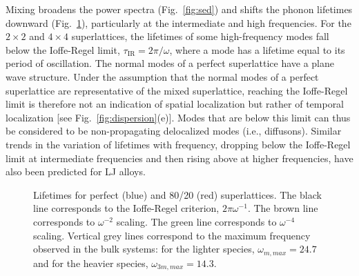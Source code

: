 \documentclass[aps,prb,preprint,preprintnumbers,amsmath,amssymb,floatfix,superscriptaddress]{revtex4}
\begin{document}
Mixing broadens the power spectra (Fig.~\ref{fig:sed}) and shifts the phonon lifetimes downward (Fig.~\ref{FIG:lifetime}), particularly at the intermediate and high frequencies. For the $2 \times 2$ and $ 4 \times 4$ superlattices,  the lifetimes of some high-frequency modes fall below the Ioffe-Regel limit, $\tau_\mathrm{IR} =2\pi/\omega$, where a mode has a lifetime equal to its period of oscillation. The normal modes of a perfect superlattice have a plane wave structure. Under the assumption that the normal modes of a perfect superlattice are representative of the mixed superlattice, reaching the Ioffe-Regel limit is therefore not an indication of spatial localization but rather of temporal localization [see Fig.~\ref{fig:dispersion}(e)]. Modes that are below this limit can thus be considered to be non-propagating delocalized modes (i.e., diffusons).\cite{allen_thermal_1993,allen1999diffusons} Similar trends in the variation of lifetimes with frequency, dropping below the Ioffe-Regel limit at intermediate frequencies and then rising above at higher frequencies, have also been predicted for LJ alloys.\cite{jason2013vc} %

\renewcommand{\textfraction}{0.0}
\begin{figure}%
\begin{center}
\renewcommand{\figure}{Fig.}
\caption{Lifetimes for perfect (blue) and 80/20 (red) superlattices. The black line corresponds to the Ioffe-Regel criterion, $2\pi\omega^{-1}$. The brown line corresponds to $\omega^{-2}$ scaling. The green line corresponds to $\omega^{-4}$ scaling. Vertical grey lines correspond to the maximum frequency observed in the bulk systems: for the lighter species, $\omega_{m,max}=24.7$ and for the heavier species, $\omega_{3m,max}=14.3$. } 
\label{FIG:lifetime}
\end{center}
\end{figure}
\end{document}
